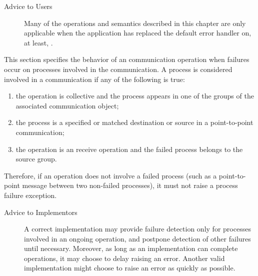 \begin{description}

\item[Advice to Users] {Many of the operations and semantics described in
this chapter are only applicable when the \mpi application has replaced
the default error handler  on, at least,
.}

\end{description}

\label{sec:ft-notification}

This section specifies the behavior of an \mpi communication
operation when
failures occur on processes involved in the communication. A process is
considered involved in a communication if any of the following is true:

\begin{enumerate}

    \item the operation is collective and the process appears in one of the
        groups {of the associated communication object};

    \item the process is a specified or matched destination or source in a
        point-to-point communication;

	\item the operation is an  receive operation and the
        failed process belongs to the source group.

\end{enumerate}


Therefore, if an operation does not involve a failed process (such as a point-to-point 
message between two non-failed processes), it must not raise a process
failure exception. 

\begin{description}

\item[Advice to Implementors] {A correct \mpi implementation may provide
failure detection only for processes involved in an ongoing operation,
and postpone detection of other failures until necessary.  Moreover, as
long as an implementation can complete operations, it may choose to
delay raising an error. Another valid implementation might choose to
raise an error as quickly as possible.}

\end{description}


